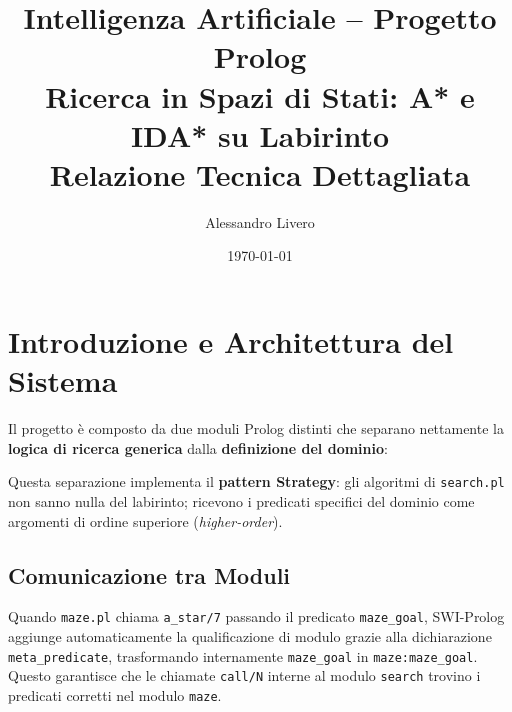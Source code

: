 \documentclass[12pt,a4paper]{article}
\title{
  \Large\textbf{Intelligenza Artificiale -- Progetto Prolog}\\[0.5em]
  \large Ricerca in Spazi di Stati: A* e IDA* su Labirinto\\[0.3em]
  \normalsize Relazione Tecnica Dettagliata
}
\author{Alessandro Livero}
\date{\today}
\begin{document}
\maketitle
\tableofcontents
\newpage

\section{Introduzione e Architettura del Sistema}

Il progetto è composto da due moduli Prolog distinti che separano nettamente la
\textbf{logica di ricerca generica} dalla \textbf{definizione del dominio}:

\begin{center}
\end{center}

\medskip
\noindent Questa separazione implementa il \textbf{pattern Strategy}: gli algoritmi di
\texttt{search.pl} non sanno nulla del labirinto; ricevono i predicati specifici
del dominio come argomenti di ordine superiore (\emph{higher-order}).

\subsection{Comunicazione tra Moduli}

Quando \texttt{maze.pl} chiama \texttt{a\_star/7} passando il predicato
\texttt{maze\_goal}, SWI-Prolog aggiunge automaticamente la qualificazione di
modulo grazie alla dichiarazione \texttt{meta\_predicate}, trasformando
internamente \texttt{maze\_goal} in \texttt{maze:maze\_goal}. Questo garantisce
che le chiamate \texttt{call/N} interne al modulo \texttt{search} trovino i
predicati corretti nel modulo \texttt{maze}.
\end{document}
